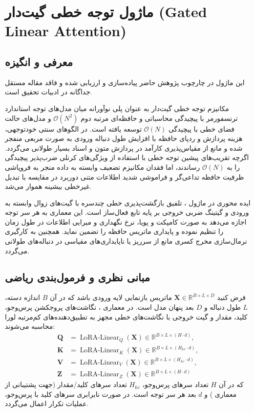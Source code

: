\section{ماژول توجه خطی گیت‌دار (Gated Linear Attention)}
\label{sec:module_gated_linear_attention}

\subsection{معرفی و انگیزه}
این ماژول در چارچوب پژوهش حاضر پیاده‌سازی و ارزیابی شده و فاقد مقاله مستقل جداگانه در ادبیات تحقیق است.

مکانیزم توجه خطی گیت‌دار  به عنوان پلی نوآورانه میان مدل‌های توجه استاندارد ترنسفورمر با پیچیدگی محاسباتی و حافظه‌ای مرتبه دوم $\mathcal{O}(N^2)$ و مدل‌های حالت فضای خطی  با پیچیدگی $\mathcal{O}(N)$ توسعه یافته است. در الگوهای سنتی خودتوجهی، هزینه پردازش و ردپای حافظه با افزایش طول دنباله ورودی به صورت مربعی منفجر شده و مانع از مقیاس‌پذیری کارآمد در پردازش متون و اسناد بسیار طولانی می‌گردد. اگرچه تقریب‌های پیشین توجه خطی با استفاده از ویژگی‌های کرنلی ضرب‌پذیر پیچیدگی را به $\mathcal{O}(N)$ رساندند، اما فقدان مکانیزم تضعیف وابسته به داده منجر به فروپاشی ظرفیت حافظه تداعی‌گر و فراموشی شدید اطلاعات متنی دوربرد در مقایسه با تبدیل غیرخطی بیشینه هموار  می‌شد.

ایده محوری در ماژول ، تلفیق بازگشت‌پذیری خطی چندسره با گیت‌های زوال وابسته به ورودی  و گیتینگ ضربی خروجی بر پایه تابع فعال‌ساز  است. این معماری به هر سر توجه اجازه می‌دهد به صورت کامپکت و پویا، نرخ نگهداری و میرایی اطلاعات در طول زمان را تنظیم نموده و پایداری ماتریس حافظه را تضمین نماید. همچنین به کارگیری نرمال‌سازی مخرج کسری مانع از سرریز یا ناپایداری‌های مقیاسی در دنباله‌های طولانی می‌گردد.

\subsection{مبانی نظری و فرمول‌بندی ریاضی}
فرض کنید $\mathbf{X} \in \mathbb{R}^{B \times L \times D}$ ماتریس بازنمایی لایه ورودی باشد که در آن $B$ اندازه دسته، $L$ طول دنباله و $D$ بعد پنهان مدل است. در معماری ، نگاشت‌های پروجکشن پرس‌وجو، کلید، مقدار و گیت خروجی با نگاشت‌های خطی مجهز به تطبیق‌دهنده‌های کم‌مرتبه لورا  محاسبه می‌شوند:
\begin{align}
\mathbf{Q} &= \operatorname{LoRA-Linear}_Q(\mathbf{X}) \in \mathbb{R}^{B \times L \times (H \cdot d)}, \\
\mathbf{K} &= \operatorname{LoRA-Linear}_K(\mathbf{X}) \in \mathbb{R}^{B \times L \times (H_{kv} \cdot d)}, \\
\mathbf{V} &= \operatorname{LoRA-Linear}_V(\mathbf{X}) \in \mathbb{R}^{B \times L \times (H_{kv} \cdot d)}, \\
\mathbf{Z} &= \operatorname{LoRA-Linear}_Z(\mathbf{X}) \in \mathbb{R}^{B \times L \times (H \cdot d)}
\end{align}
که در آن $H$ تعداد سرهای پرس‌وجو، $H_{kv}$ تعداد سرهای کلید/مقدار (جهت پشتیبانی از معماری ) و $d$ بعد هر سر توجه است. در صورت نابرابری سرهای کلید با پرس‌وجو، عملیات تکرار  اعمال می‌گردد.

